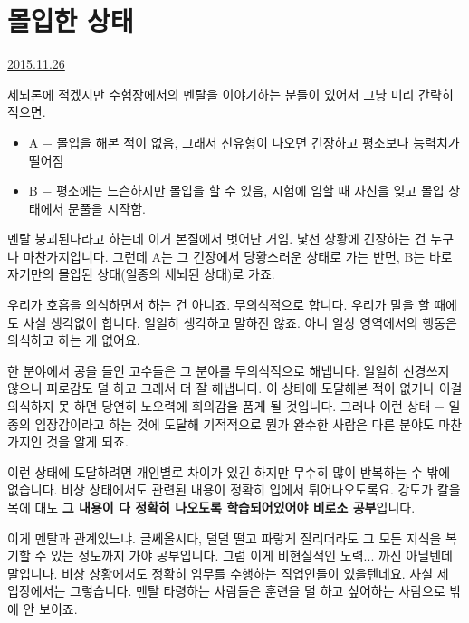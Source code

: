\section{몰입한 상태}
\href{https://www.kockoc.com/Apoc/512266}{2015.11.26}

\vspace{5mm}

세뇌론에 적겠지만 수험장에서의 멘탈을 이야기하는 분들이 있어서 그냥 미리 간략히 적으면.
\vspace{5mm}
\begin{itemize}
    \item A $-$ 몰입을 해본 적이 없음, 그래서 신유형이 나오면 긴장하고 평소보다 능력치가 떨어짐
    \item B $-$ 평소에는 느슨하지만 몰입을 할 수 있음, 시험에 임할 때 자신을 잊고 몰입 상태에서 문풀을 시작함.
\end{itemize}
\vspace{5mm}

멘탈 붕괴된다라고 하는데 이거 본질에서 벗어난 거임.
낯선 상황에 긴장하는 건 누구나 마찬가지입니다.
그런데 A는 그 긴장에서 당황스러운 상태로 가는 반면, B는 바로 자기만의 몰입된 상태(일종의 세뇌된 상태)로 가죠.
\vspace{5mm}

우리가 호흡을 의식하면서 하는 건 아니죠. 무의식적으로 합니다.
우리가 말을 할 때에도 사실 생각없이 합니다. 일일히 생각하고 말하진 않죠.
아니 일상 영역에서의 행동은 의식하고 하는 게 없어요.
\vspace{5mm}

한 분야에서 공을 들인 고수들은 그 분야를 무의식적으로 해냅니다. 일일히 신경쓰지 않으니 피로감도 덜 하고 그래서 더 잘 해냅니다.
이 상태에 도달해본 적이 없거나 이걸 의식하지 못 하면 당연히 노오력에 회의감을 품게 될 것입니다.
그러나 이런 상태 $-$ 일종의 임장감이라고 하는 것에 도달해 기적적으로 뭔가 완수한 사람은 다른 분야도 마찬가지인 것을 알게 되죠.
\vspace{5mm}

이런 상태에 도달하려면 개인별로 차이가 있긴 하지만 무수히 많이 반복하는 수 밖에 없습니다.
비상 상태에서도 관련된 내용이 정확히 입에서 튀어나오도록요.
강도가 칼을 목에 대도 \textbf{그 내용이 다 정확히 나오도록 학습되어있어야 비로소 공부}입니다.
\vspace{5mm}

이게 멘탈과 관계있느냐. 글쎄올시다, 덜덜 떨고 파랗게 질리더라도 그 모든 지식을 복기할 수 있는 정도까지 가야 공부입니다.
그럼 이게 비현실적인 노력... 까진 아닐텐데 말입니다. 비상 상황에서도 정확히 임무를 수행하는 직업인들이 있을텐데요.
사실 제 입장에서는 그렇습니다. 멘탈 타령하는 사람들은 훈련을 덜 하고 싶어하는 사람으로 밖에 안 보이죠.
\vspace{5mm}

